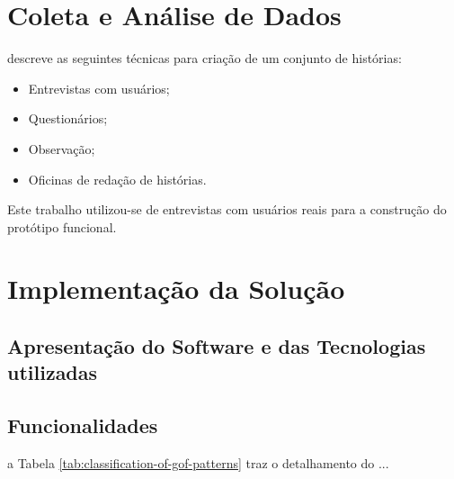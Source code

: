 \label{cap:desenvolvimento}


\section{Coleta e Análise de Dados} \label{analise} \textbf{ }

     descreve as seguintes técnicas para criação de um conjunto de histórias:
    \begin{itemize}
        \item Entrevistas com usuários;
        \item Questionários;
        \item Observação;
        \item Oficinas de redação de histórias.
    \end{itemize}

    Este trabalho utilizou-se de entrevistas com usuários reais para a construção do protótipo funcional.


\section{Implementação da Solução} \label{implement} \textbf{ }

    \subsection{Apresentação do Software e das Tecnologias utilizadas} \textbf{ }

    \clearpage
    \subsection{Funcionalidades} \textbf{ }

        a Tabela \ref{tab:classification-of-gof-patterns} traz o detalhamento do ...
        
